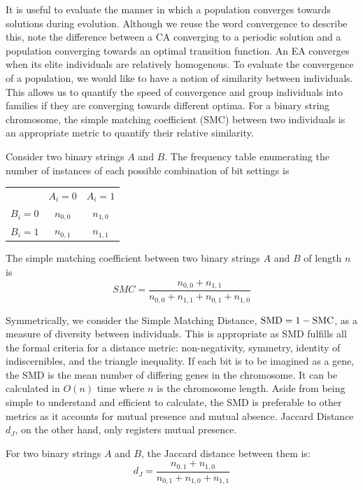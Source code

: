 It is useful to evaluate the manner in which a population converges towards solutions during evolution. Although we reuse the word convergence to describe this, note the difference between a CA converging to a periodic solution and a population converging towards an optimal transition function. An EA converges when its elite individuals are relatively homogenous. To evaluate the convergence of a population, we would like to have a notion of similarity between individuals. This allows us to quantify the speed of convergence and group individuals into families if they are converging towards different optima. For a binary string chromosome, the simple matching coefficient (SMC) between two individuals is an appropriate metric to quantify their relative similarity. 
\begin{definition} Consider two binary strings $A$ and $B$. The frequency table enumerating the number of instances of each possible combination of bit settings is
\begin{center}
    \begin{tabular}{ c c c }
              & $A_i = 0$ & $A_i = 1$ \\ 
        $B_i = 0$ & $n_{0,0}$ & $n_{1,0}$ \\  
        $B_i = 1$ & $n_{0,1}$ & $n_{1, 1}$    
    \end{tabular}
\end{center}
The simple matching coefficient between two binary strings $A$ and $B$ of length $n$ is\\
\begin{equation}
    SMC = \frac{n_{0, 0} + n_{1, 1}}{n_{0, 0} + n_{1, 1} + n_{0, 1} + n_{1, 0}}
\end{equation}
    
\end{definition}
Symmetrically, we consider the Simple Matching Distance, $\textnormal{SMD} = 1 - \textnormal{SMC}$, as a measure of diversity between individuals. This is appropriate as SMD fulfills all the formal criteria for a distance metric: non-negativity, symmetry, identity of indiscernibles, and the triangle inequality. If each bit is to be imagined as a gene, the SMD is the mean number of differing genes in the chromosome. It can be calculated in $O(n)$ time where $n$ is the chromosome length. Aside from being simple to understand and efficient to calculate, the SMD is preferable to other metrics as it accounts for mutual presence and mutual absence. Jaccard Distance $d_J$, on the other hand, only registers mutual presence. 
\begin{definition}
For two binary strings $A$ and $B$, the Jaccard distance between them is:
\begin{equation}
    d_J = \frac{n_{0, 1} + n_{1, 0}}{n_{0, 1} + n_{1, 0} + n_{1, 1}}
\end{equation}
\end{definition}

